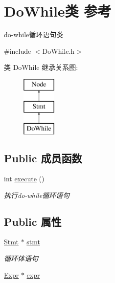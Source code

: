 \hypertarget{class_do_while}{}\section{Do\+While类 参考}
\label{class_do_while}


do-\/while循环语句类  




{\ttfamily \#include $<$Do\+While.\+h$>$}

类 Do\+While 继承关系图\+:\begin{figure}[H]
\begin{center}
\leavevmode
\includegraphics[height=3.000000cm]{class_do_while}
\end{center}
\end{figure}
\subsection*{Public 成员函数}
\begin{DoxyCompactItemize}
\item 
\mbox{\label{class_do_while_adb6934e033f44c6b52b1079faf1d84cf}} 
int \hyperlink{class_do_while_adb6934e033f44c6b52b1079faf1d84cf}{execute} ()
\begin{DoxyCompactList}\small\item\em 执行do-\/while循环语句 \end{DoxyCompactList}\end{DoxyCompactItemize}
\subsection*{Public 属性}
\begin{DoxyCompactItemize}
\item 
\mbox{\label{class_do_while_a0aee68f104ddceeb30a4e061cf315e0f}} 
\hyperlink{class_stmt}{Stmt} $\ast$ \hyperlink{class_do_while_a0aee68f104ddceeb30a4e061cf315e0f}{stmt}
\begin{DoxyCompactList}\small\item\em 循环体语句 \end{DoxyCompactList}\item 
\hyperlink{class_expr}{Expr} $\ast$ \hyperlink{class_do_while_a55d5ffb9c6bee10f8375f028705e4901}{expr}
\end{DoxyCompactItemize}
